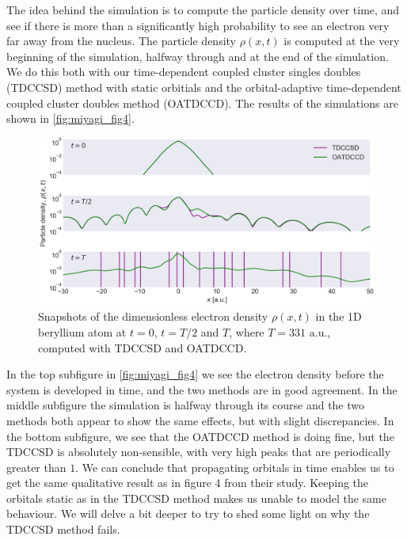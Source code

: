 The idea behind the simulation is to compute the particle density over time, and see if 
there is more than a significantly high probability to see an electron very far away from the 
nucleus. The particle density 
$\rho(x, t)$ is computed at the very beginning of the simulation, halfway through 
and at the end of the simulation. We do this both with our time-dependent coupled 
cluster singles doubles (TDCCSD) method with static orbitials and 
the orbital-adaptive time-dependent 
coupled cluster doubles method (OATDCCD). 
The results of the simulations are shown in 
\autoref{fig:miyagi_fig4}.

\begin{figure}
    \centering
    \includegraphics[width=\textwidth]{results/figures/miyagi/fig4_miqyagi.png} 
    \caption{Snapshots of the dimensionless electron density $\rho(x, t)$ in the 1D beryllium atom 
        at $t=0$, $t=T/2$ and $T$, where $T = 331 \text{ a.u.}$,
        computed with TDCCSD and OATDCCD. 
    }
    \label{fig:miyagi_fig4}
\end{figure}

In the top subfigure in \autoref{fig:miyagi_fig4} we see the electron density before 
the system is developed in time, and the two methods are in good agreement. In 
the middle subfigure the simulation is halfway through its course and the two methods
both appear to show the same effects, but with 
slight discrepancies. In the bottom subfigure, we see that the OATDCCD method is doing
fine, but the TDCCSD is absolutely non-sensible, with very high peaks that are periodically 
greater than $1$. We can conclude that propagating 
orbitals in time enables us to get the same qualitative result as \citeauthor{miyagi2013time}
in figure 4 from their study. Keeping the orbitals static as in the TDCCSD method makes 
us unable to model the same behaviour. We will delve a bit deeper to try to shed 
some light on why the TDCCSD method fails.

